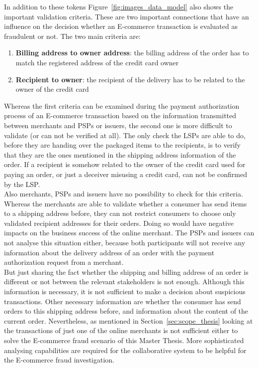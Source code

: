 In addition to these tokens Figure~\ref{fig:images_data_model} also shows the important validation criteria. These are two important connections that have an influence on the decision whether an \gls{E-commerce} transaction is evaluated as fraudulent or not. The two main criteria are: \@

\begin{enumerate}
  \item \textbf{Billing address to owner address}: the billing address of the order has to match the registered address of the credit card owner
  \item \textbf{Recipient to owner}: the recipient of the delivery has to be related to the owner of the credit card
\end{enumerate}

Whereas the first criteria can be examined during the payment authorization process of an \gls{E-commerce} transaction based on the information transmitted between merchants and \gls{PSP}s or issuers, the second one is more difficult to validate (or can not be verified at all). The only check the \gls{LSP}s are able to do, before they are handing over the packaged items to the recipients, is to verify that they are the ones mentioned in the shipping address information of the order. If a recipient is somehow related to the owner of the credit card used for paying an order, or just a deceiver misusing a credit card, can not be confirmed by the \gls{LSP}. \\

Also merchants, \gls{PSP}s and issuers have no possibility to check for this criteria. Whereas the merchants are able to validate whether a consumer has send items to a shipping address before, they can not restrict consumers to choose only validated recipient addresses for their orders. Doing so would have negative impacts on the business success of the online merchant. The \gls{PSP}s and issuers can not analyse this situation either, because both participants will not receive any information about the delivery address of an order with the payment authorization request from a merchant. \\

But just sharing the fact whether the shipping and billing address of an order is different or not between the relevant stakeholders is not enough. Although this information is necessary, it is not sufficient to make a decision about suspicious transactions. Other necessary information are whether the consumer has send orders to this shipping address before, and information about the content of the current order. Nevertheless, as mentioned in Section~\ref{sec:scope_thesis} looking at the transactions of just one of the online merchants is not sufficient either to solve the \gls{E-commerce} fraud scenario of this Master Thesis. More sophisticated analysing capabilities are required for the collaborative system to be helpful for the \gls{E-commerce} fraud investigation.

